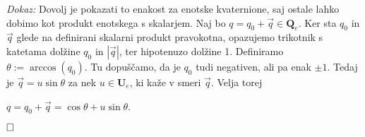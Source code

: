 \documentclass[a4paper,12pt]{article}
\def\R{\mathbb{R}} %
\def\H{\mathbb{H}} %
\def\Qe{\textbf{Q}_{e}} %
\def\Ue{\textbf{U}_{e}} %
\def\qed{$\hfill\Box$}   %
\begin{document}
\noindent
{\em Dokaz: \/}Dovolj je pokazati to enakost za enotske kvaternione, saj ostale lahko dobimo kot produkt enotskega s skalarjem.
Naj bo $q = q_{0} + \vec{q} \in \Qe$. Ker sta $q_{0}$ in $\vec{q}$ glede na definirani skalarni produkt pravokotna, opazujemo trikotnik s katetama dolžine $q_{0}$ in $|\vec{q}|$, ter hipotenuzo dolžine 1.
Definiramo $\theta := \arccos(q_{0})$. Tu dopuščamo, da je $q_{0}$ tudi negativen, ali pa enak $\pm 1$. Tedaj je $\vec{q} = u\sin\theta$ za nek $u \in \Ue$, ki kaže v smeri $\vec{q}$.
Velja torej
\begin{center}
   $q = q_{0} + \vec{q} = \cos\theta + u\sin\theta$.
\end{center}
\qed






\end{document}
